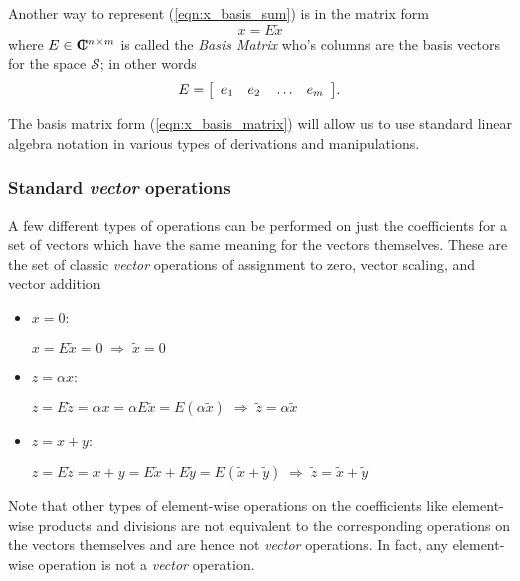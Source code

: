 Another way to represent (\ref{eqn:x_basis_sum}) is in the matrix form
%
\begin{equation}
x = E \tilde{x}
\label{eqn:x_basis_matrix}
\end{equation}
%
where $E\in\CPLX^{n\times{}m}$ is called the {}\textit{Basis Matrix} who's
columns are the basis vectors for the space $\mathcal{S}$; in other words
%
\begin{equation}
E = {\bmat{cccc} e_1 & e_2 & {}\ldots & e_m {}\emat}.
\end{equation}
%

The basis matrix form (\ref{eqn:x_basis_matrix}) will allow us to use standard
linear algebra notation in various types of derivations and manipulations.

\subsubsection{Standard {}\textit{vector} operations}

A few different types of operations can be performed on just the coefficients
for a set of vectors which have the same meaning for the vectors themselves.
These are the set of classic {}\textit{vector} operations of assignment to
zero, vector scaling, and vector addition

\begin{itemize}

{}\item $x = 0$:

$x = E \tilde{x} = 0 \; \Rightarrow \; \tilde{x} = 0$ 

{}\item $z = \alpha x$:

$z = E \tilde{z} = \alpha x = \alpha E \tilde{x} = E ( \alpha
\tilde{x} ) \; \Rightarrow \; \tilde{z} = \alpha \tilde{x}$

{}\item $z = x + y$:

$z = E \tilde{z} = x + y = E \tilde{x} + E \tilde{y} = E ( \tilde{x} +
\tilde{y} ) \; \Rightarrow \; \tilde{z} = \tilde{x} + \tilde{y}$

\end{itemize}

Note that other types of element-wise operations on the coefficients like
element-wise products and divisions are not equivalent to the corresponding
operations on the vectors themselves and are hence not {}\textit{vector}
operations.  In fact, any element-wise operation is not a {}\textit{vector}
operation.

